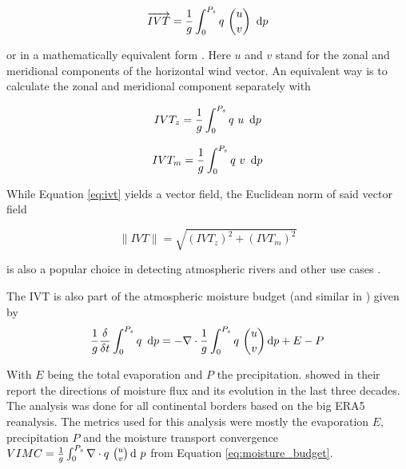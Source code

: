 \begin{equation}
\label{eq:ivt}  
\overrightarrow{IVT} = \frac{1}{g} \int^{P_s}_0 q ~\binom{u}{v} ~ \operatorname{d}\!{p}
\end{equation}

or in a mathematically equivalent form \cite{fernandez_analysis_2003}.
Here $u$ and $v$ stand for the zonal and meridional components of the horizontal wind vector. 
An equivalent way is to calculate the zonal and meridional component separately with 

\begin{equation}
\label{eq:zonal_ivt}
IVT_z = \frac{1}{g} \int^{P_s}_0 q ~u ~ \operatorname{d}\!{p}
\end{equation}


\begin{equation}
\label{eq:meridional_ivt}
IVT_m = \frac{1}{g} \int^{P_s}_0 q ~v ~ \operatorname{d}\!{p}
\end{equation}

While Equation \ref{eq:ivt} yields a vector field, the Euclidean norm of said vector field 

\begin{equation}
\label{eq:ivtnorm}
\lVert IVT \rVert = \sqrt{(IVT_z)^2 + (IVT_m)^2}  
\end{equation}

is also a popular choice in detecting atmospheric rivers \cite{sousa_north_2020, ramos_atmospheric_2016} and other use cases \cite{ayantobo_integrated_2022}.



The IVT is also part of the atmospheric moisture budget \cite{yang_moisture_2022} (and similar in \cite{seager_mechanisms_2020}) given by 
\begin{equation}
\label{eq:moisture_budget}
\frac{1}{g} \frac{\delta}{\delta t} \int^{P_s}_0 q ~ \operatorname{d}\!{p} = - \nabla \cdot \frac{1}{g} \int^{P_s}_0 q ~\binom{u}{v} \operatorname{d}\!{p} + E - P
\end{equation}

With $E$ being the total evaporation and $P$ the precipitation. 
\citeauthor{yang_moisture_2022} showed in their report \cite{yang_moisture_2022} the directions of moisture flux and its evolution in the last three decades. The analysis was done for all continental borders based on the big ERA5 reanalysis.
The metrics used for this analysis were mostly the evaporation $E$, precipitation $P$ and the moisture transport convergence  $VIMC = \frac{1}{g} \int^{P_s}_0  \nabla \cdot q ~\binom{u}{v} \operatorname{d}\!{~} p$ from Equation \ref{eq:moisture_budget}.


